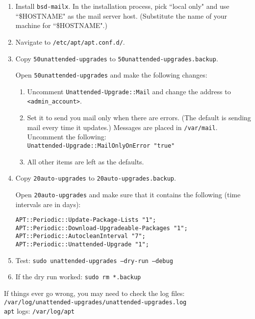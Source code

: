 \begin{enumerate}
\item Install \texttt{bsd-mailx}. In the installation process, pick ``local only" and use ``\$HOSTNAME" as the mail server host. (Substitute the name of your machine for ``\$HOSTNAME".)

\item Navigate to \texttt{/etc/apt/apt.conf.d/}.

\item Copy \texttt{50unattended-upgrades} to \texttt{50unattended-upgrades.backup}.

Open \texttt{50unattended-upgrades} and make the following changes:
	\begin{enumerate}
	\item Uncomment \texttt{Unattended-Upgrade::Mail} and change the address to \texttt{<admin\_account>}. 

	\item Set it to send you mail only when there are errors. (The default is sending mail every time it updates.) Messages are placed in \texttt{/var/mail}. Uncomment the following: \\
	\texttt{Unattended-Upgrade::MailOnlyOnError "true"}
			
	\item All other items are left as the defaults.
	\end{enumerate}

\item Copy \texttt{20auto-upgrades} to \texttt{20auto-upgrades.backup}.

	Open \texttt{20auto-upgrades} and make sure that it contains the following (time intervals are in days):
	\begin{verbatim}
APT::Periodic::Update-Package-Lists "1";
APT::Periodic::Download-Upgradeable-Packages "1";
APT::Periodic::AutocleanInterval "7";
APT::Periodic::Unattended-Upgrade "1";
	\end{verbatim}

\item Test: \texttt{sudo unattended-upgrades --dry-run --debug}

\item If the dry run worked: \texttt{sudo rm *.backup}
\end{enumerate}

\noindent If things ever go wrong, you may need to check the log files: \\
	\texttt{/var/log/unattended-upgrades/unattended-upgrades.log} \\
	\texttt{apt} logs: \texttt{/var/log/apt}

